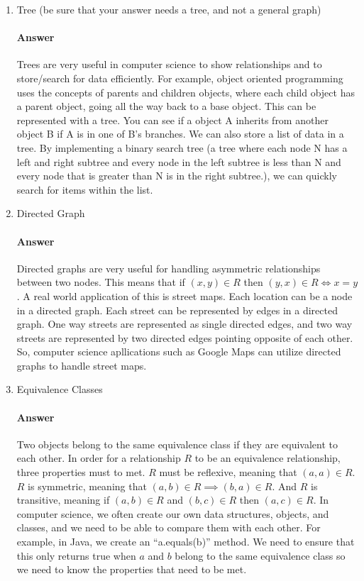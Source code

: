 \documentclass{article}
\begin{document}
\begin{enumerate}

    \item Tree (be sure that your answer needs a tree, and not a general graph)

        \paragraph{Answer}

        Trees are very useful in computer science to show relationships and to store/search for data efficiently. For example, object oriented programming uses the concepts of parents and children objects, where each child object has a parent object, going all the way back to a base object. This can be represented with a tree. You can see if a object A inherits from another object B if A is in one of B's branches. We can also store a list of data in a tree. By implementing a binary search tree (a tree where each node N has a left and right subtree and every node in the left subtree is less than N and every node that is greater than N is in the right subtree.),  we can quickly search for items within the list.

    \item Directed Graph

        \paragraph{Answer}

       Directed graphs are very useful for handling asymmetric relationships between two nodes. This means that if $(x, y) \in R$ then $(y, x) \in R \iff x=y$. A real world application of this is street maps. Each location can be a node in a directed graph. Each street can be represented by edges in a directed graph. One way streets are represented as single directed edges, and two way streets are represented by two directed edges pointing opposite of each other. So, computer science apllications such as Google Maps can utilize directed graphs to handle street maps.

    \item Equivalence Classes

        \paragraph{Answer}

        Two objects belong to the same equivalence class if they are equivalent to each other. In order for a relationship $R$ to be an equivalence relationship, three properties must to met. $R$ must be reflexive, meaning that $(a,a) \in R$. $R$ is symmetric, meaning that $(a,b) \in R \implies (b,a) \in R$. And $R$ is transitive, meaning if $(a,b) \in R$ and $(b,c) \in R$ then $(a,c) \in R$. In computer science, we often create our own data structures, objects, and classes, and we need to be able to compare them with each other. For example, in Java, we create an ``a.equals(b)'' method. We need to ensure that this only returns true when $a$ and $b$ belong to the same equivalence class so we need to know the properties that need to be met.
        

\end{enumerate}
\end{document}
